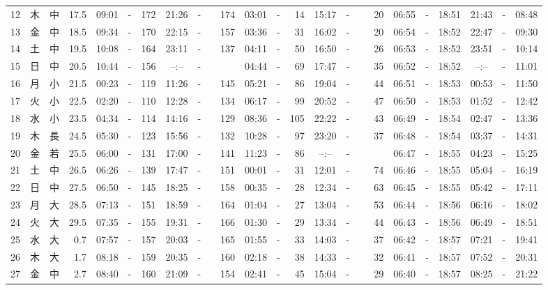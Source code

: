 \documentclass[12pt,a4j]{jsarticle}
\begin{document}
\begin{table}[htbp]
\begin{center}
{\begin{tabular}{|rc|cr|ccrccr|ccrccr|ccc|ccc|}
12 & 木 & 中 & 17.5 &  09:01 &-& 172 &  21:26 &-& 174 &  03:01 &-&  14 &  15:17 &-&  20 & 06:55 & -& 18:51 & 21:43 & -& 08:48 \\
13 & 金 & 中 & 18.5 &  09:34 &-& 170 &  22:15 &-& 157 &  03:36 &-&  31 &  16:02 &-&  20 & 06:54 & -& 18:52 & 22:47 & -& 09:30 \\
14 & 土 & 中 & 19.5 &  10:08 &-& 164 &  23:11 &-& 137 &  04:11 &-&  50 &  16:50 &-&  26 & 06:53 & -& 18:52 & 23:51 & -& 10:14 \\
15 & 日 & 中 & 20.5 &  10:44 &-& 156 &  --:-- &-&~~~~~ &  04:44 &-&  69 &  17:47 &-&  35 & 06:52 & -& 18:52 & --:-- & -& 11:01 \\
16 & 月 & 小 & 21.5 &  00:23 &-& 119 &  11:26 &-& 145 &  05:21 &-&  86 &  19:04 &-&  44 & 06:51 & -& 18:53 & 00:53 & -& 11:50 \\
17 & 火 & 小 & 22.5 &  02:20 &-& 110 &  12:28 &-& 134 &  06:17 &-&  99 &  20:52 &-&  47 & 06:50 & -& 18:53 & 01:52 & -& 12:42 \\
18 & 水 & 小 & 23.5 &  04:34 &-& 114 &  14:16 &-& 129 &  08:36 &-& 105 &  22:22 &-&  43 & 06:49 & -& 18:54 & 02:47 & -& 13:36 \\
19 & 木 & 長 & 24.5 &  05:30 &-& 123 &  15:56 &-& 132 &  10:28 &-&  97 &  23:20 &-&  37 & 06:48 & -& 18:54 & 03:37 & -& 14:31 \\
20 & 金 & 若 & 25.5 &  06:00 &-& 131 &  17:00 &-& 141 &  11:23 &-&  86 &  --:-- &-&~~~~~ & 06:47 & -& 18:55 & 04:23 & -& 15:25 \\
21 & 土 & 中 & 26.5 &  06:26 &-& 139 &  17:47 &-& 151 &  00:01 &-&  31 &  12:01 &-&  74 & 06:46 & -& 18:55 & 05:04 & -& 16:19 \\
22 & 日 & 中 & 27.5 &  06:50 &-& 145 &  18:25 &-& 158 &  00:35 &-&  28 &  12:34 &-&  63 & 06:45 & -& 18:55 & 05:42 & -& 17:11 \\
23 & 月 & 大 & 28.5 &  07:13 &-& 151 &  18:59 &-& 164 &  01:04 &-&  27 &  13:04 &-&  53 & 06:44 & -& 18:56 & 06:16 & -& 18:02 \\
24 & 火 & 大 & 29.5 &  07:35 &-& 155 &  19:31 &-& 166 &  01:30 &-&  29 &  13:34 &-&  44 & 06:43 & -& 18:56 & 06:49 & -& 18:51 \\
25 & 水 & 大 &  0.7 &  07:57 &-& 157 &  20:03 &-& 165 &  01:55 &-&  33 &  14:03 &-&  37 & 06:42 & -& 18:57 & 07:21 & -& 19:41 \\
26 & 木 & 大 &  1.7 &  08:18 &-& 159 &  20:35 &-& 160 &  02:18 &-&  38 &  14:33 &-&  32 & 06:41 & -& 18:57 & 07:52 & -& 20:31 \\
27 & 金 & 中 &  2.7 &  08:40 &-& 160 &  21:09 &-& 154 &  02:41 &-&  45 &  15:04 &-&  29 & 06:40 & -& 18:57 & 08:25 & -& 21:22 \\

\end{tabular}}
\end{center}
\end{table}
\end{document}
